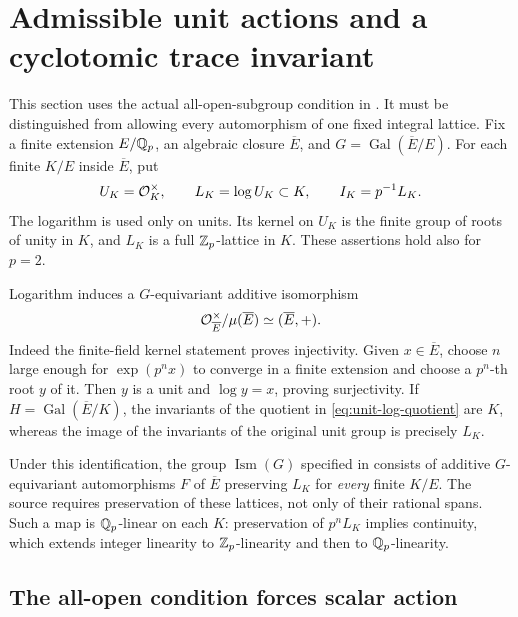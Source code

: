 \section{Admissible unit actions and a cyclotomic trace invariant}
\label{sec:admissible-arrows}

This section uses the actual all-open-subgroup condition in
\cite[Example~1.8(iv), author-version pp.~38--39]{IUT2}.
It must be distinguished from allowing every automorphism of one fixed
integral lattice. Fix a finite extension $E/\mathbb Q_p$, an algebraic closure
$\overline E$, and $G=\operatorname{Gal}(\overline E/E)$. For each finite
$K/E$ inside $\overline E$, put
\[
 U_K=\mathcal O_K^\times,\qquad L_K=\log U_K\subset K,
 \qquad I_K=p^{-1}L_K.
\]
The logarithm is used only on units. Its kernel on $U_K$ is the finite
group of roots of unity in $K$, and $L_K$ is a full $\mathbb Z_p$-lattice in $K$.
These assertions hold also for $p=2$.

Logarithm induces a $G$-equivariant additive isomorphism
\begin{equation}\label{eq:unit-log-quotient}
 \mathcal O_{\overline E}^\times/\mu(\overline E)
       \simeq (\overline E,+).
\end{equation}
Indeed the finite-field kernel statement proves injectivity. Given
$x\in\overline E$, choose $n$ large enough for $\exp(p^n x)$ to converge
in a finite extension and choose a $p^n$-th root $y$ of it. Then $y$ is
a unit and $\log y=x$, proving surjectivity. If
$H=\operatorname{Gal}(\overline E/K)$, the invariants of the quotient
in \eqref{eq:unit-log-quotient} are $K$, whereas the image of the
invariants of the original unit group is precisely $L_K$.

Under this identification, the group $\operatorname{Ism}(G)$ specified
in \cite{IUT2} consists of additive $G$-equivariant automorphisms $F$ of
$\overline E$ preserving $L_K$ for \emph{every} finite $K/E$. The source
requires preservation of these lattices, not only of their rational
spans. Such a map is $\mathbb Q_p$-linear on each $K$: preservation of
$p^nL_K$ implies continuity, which extends integer linearity to
$\mathbb Z_p$-linearity and then to $\mathbb Q_p$-linearity.

\subsection{The all-open condition forces scalar action}

